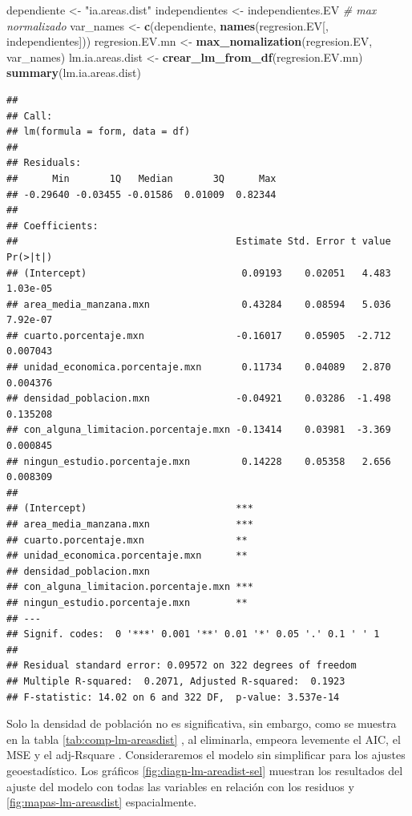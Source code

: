 \documentclass[12pt,]{book}
\newenvironment{Shaded}{\begin{snugshade}}{\end{snugshade}}
\newcommand{\KeywordTok}[1]{\textcolor[rgb]{0.13,0.29,0.53}{\textbf{#1}}}
\newcommand{\StringTok}[1]{\textcolor[rgb]{0.31,0.60,0.02}{#1}}
\newcommand{\CommentTok}[1]{\textcolor[rgb]{0.56,0.35,0.01}{\textit{#1}}}
\newcommand{\NormalTok}[1]{#1}
\begin{document}
\begin{Shaded}
\begin{Highlighting}[]
\NormalTok{dependiente <-}\StringTok{ "ia.areas.dist"}
\NormalTok{independientes <-}\StringTok{ }\NormalTok{independientes.EV}
\CommentTok{# max normalizado}
\NormalTok{var_names <-}\StringTok{ }\KeywordTok{c}\NormalTok{(dependiente, }\KeywordTok{names}\NormalTok{(regresion.EV[, independientes]))}
\NormalTok{regresion.EV.mn <-}\StringTok{ }\KeywordTok{max_nomalization}\NormalTok{(regresion.EV, var_names)}
\NormalTok{lm.ia.areas.dist <-}\StringTok{ }\KeywordTok{crear_lm_from_df}\NormalTok{(regresion.EV.mn)}
\KeywordTok{summary}\NormalTok{(lm.ia.areas.dist)}
\end{Highlighting}
\end{Shaded}

\begin{verbatim}
## 
## Call:
## lm(formula = form, data = df)
## 
## Residuals:
##      Min       1Q   Median       3Q      Max 
## -0.29640 -0.03455 -0.01586  0.01009  0.82344 
## 
## Coefficients:
##                                      Estimate Std. Error t value Pr(>|t|)
## (Intercept)                           0.09193    0.02051   4.483 1.03e-05
## area_media_manzana.mxn                0.43284    0.08594   5.036 7.92e-07
## cuarto.porcentaje.mxn                -0.16017    0.05905  -2.712 0.007043
## unidad_economica.porcentaje.mxn       0.11734    0.04089   2.870 0.004376
## densidad_poblacion.mxn               -0.04921    0.03286  -1.498 0.135208
## con_alguna_limitacion.porcentaje.mxn -0.13414    0.03981  -3.369 0.000845
## ningun_estudio.porcentaje.mxn         0.14228    0.05358   2.656 0.008309
##                                         
## (Intercept)                          ***
## area_media_manzana.mxn               ***
## cuarto.porcentaje.mxn                ** 
## unidad_economica.porcentaje.mxn      ** 
## densidad_poblacion.mxn                  
## con_alguna_limitacion.porcentaje.mxn ***
## ningun_estudio.porcentaje.mxn        ** 
## ---
## Signif. codes:  0 '***' 0.001 '**' 0.01 '*' 0.05 '.' 0.1 ' ' 1
## 
## Residual standard error: 0.09572 on 322 degrees of freedom
## Multiple R-squared:  0.2071, Adjusted R-squared:  0.1923 
## F-statistic: 14.02 on 6 and 322 DF,  p-value: 3.537e-14
\end{verbatim}

Solo la densidad de población no es significativa, sin embargo, como se
muestra en la tabla \ref{tab:comp-lm-areasdist} , al eliminarla, empeora
levemente el AIC, el MSE y el adj-Rsquare . Consideraremos el modelo sin
simplificar para los ajustes geoestadístico. Los gráficos
\ref{fig:diagn-lm-areadist-sel} muestran los resultados del ajuste del
modelo con todas las variables en relación con los residuos y
\ref{fig:mapas-lm-areasdist} espacialmente.
\end{document}
